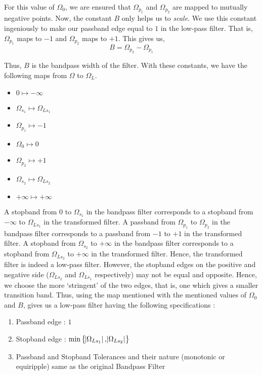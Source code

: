 \documentclass{article}
\theoremstyle{definition}
\begin{document}
For this value of $\Omega_0$, we are ensured that $\Omega_{p_1}$ and $\Omega_{p_2}$ are mapped to mutually negative points. Now, the constant $B$ only helps us to \textit{scale}. We use this constant ingeniously to make our passband edge equal to $1$ in the low-pass filter. That is, $\Omega_{p_1}$ maps to $-1$ and $\Omega_{p_2}$ maps to $+1$. This gives us,
\[
    \boxed{B = \Omega_{p_2} - \Omega_{p_1}}
\]

Thus, $B$ is the bandpass width of the filter. With these constants, we have the following maps from $\Omega$ to $\Omega_L$. 

\begin{itemize}
    \item $0 \longmapsto -\infty$
    \item $\Omega_{s_1} \longmapsto \Omega_{Ls_1}$
    \item $\Omega_{p_1} \longmapsto -1$
    \item $\Omega_0 \longmapsto 0$
    \item $\Omega_{p_2} \longmapsto +1$
    \item $\Omega_{s_2} \longmapsto \Omega_{Ls_2}$
    \item $+\infty \longmapsto +\infty$
\end{itemize}

A stopband from $0$ to $\Omega_{s_1}$ in the bandpass filter corresponds to a stopband from $-\infty$ to $\Omega_{Ls_1}$ in the transformed filter. A passband from $\Omega_{p_1}$ to $\Omega_{p_2}$ in the bandpass filter corresponds to a passband from $-1$ to $+1$ in the transformed filter. A stopband from $\Omega_{s_2}$ to $+\infty$ in the bandpass filter corresponds to a stopband from $\Omega_{Ls_2}$ to $+\infty$ in the transformed filter. Hence, the transformed filter is indeed a low-pass filter. However, the stopband edges on the positive and negative side ($\Omega_{Ls_2}$ and $\Omega_{Ls_1}$ respectively) may not be equal and opposite. Hence, we choose the more `stringent' of the two edges, that is, one which gives a smaller transition band. Thus, using the map mentioned with the mentioned values of $\Omega_0$ and $B$, gives us a low-pass filter having the following specifications :

\begin{enumerate}
    \item Passband edge : $1$
    \item Stopband edge : $\min \left\{ \abs{\Omega_{Ls_1}} , \abs{\Omega_{Ls_2}}\right\}$
    \item Passband and Stopband Tolerances and their nature (monotonic or equiripple) same as the original Bandpass Filter
\end{enumerate}
\end{document}
